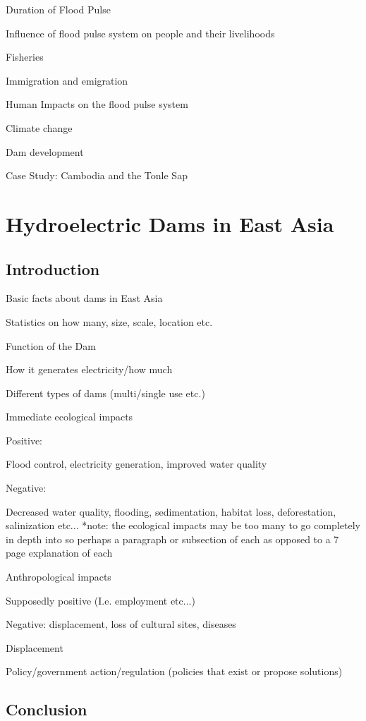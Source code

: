 \documentclass{book}\usepackage{knitr}
\begin{document}
Duration of Flood Pulse

Influence of flood pulse system on people and their livelihoods

Fisheries

Immigration and emigration

Human Impacts on the flood pulse system

Climate change

Dam development

Case Study: Cambodia and the Tonle Sap


\chapter{Hydroelectric Dams in East Asia}

\section{Introduction}

Basic facts about dams in East Asia


Statistics on how many, size, scale, location etc.

Function of the Dam 

How it generates electricity/how much

Different types of dams (multi/single use etc.) 

Immediate ecological impacts 

Positive: 

Flood control, electricity generation, improved water quality 

Negative: 

Decreased water quality, flooding, sedimentation, habitat loss, deforestation, salinization etc... *note: the ecological impacts may be too many to go completely in depth into so perhaps a paragraph or subsection of each as opposed to a 7 page explanation of each 

Anthropological impacts 

Supposedly positive (I.e. employment etc...)

Negative: displacement, loss of cultural sites, diseases 

Displacement

Policy/government action/regulation  (policies that exist or propose solutions)

\section{Conclusion}
\end{document}
